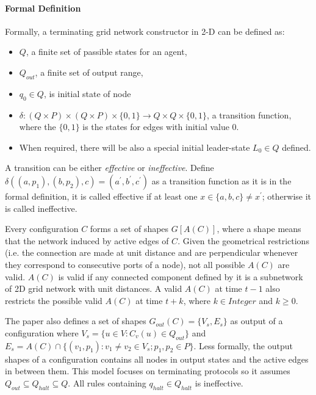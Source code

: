 \par\noindent
\paragraph{Formal Definition}
Formally, a terminating grid network constructor in 2-D can be defined as:
\begin{itemize}
  \item $Q$, a finite set of passible states for an agent,
  \item $Q_{out}$, a finite set of output range,
  \item $q_{0} \in Q $, is initial state of node
  \item $\delta: (Q \times P ) \times (Q \times P) \times \{0,1\} \to Q \times Q \times \{0,1\}$, a transition function, where the $\{0,1\}$ is the states for edges with initial value 0.
  \item When required, there will be also a special initial leader-state $L_{0} \in Q $ defined.
\end{itemize}

\par\noindent
A transition can be either \textit{effective}
or \textit{ineffective}. Define $\delta((a, p_{1}), (b, p_{2}), c) = (a^{'}, b^{'},c^{'})$ as a transition function
as it is in the formal definition, it is called effective if at least one $x \in \{a,b,c\} \not= x^{'} $; otherwise it is called ineffective.


\par\noindent
Every configuration $C$ forms a set of shapes $G[A(C)]$, where a shape means that the network induced
by active edges of $C$. Given the geometrical restrictions (i.e. the connection are
made at unit distance and are perpendicular whenever they correspond to consecutive ports of a node),
not all possible $A(C)$ are valid. $A(C)$ is valid if any connected component defined by it is a
subnetwork of 2D grid network with unit distances. A valid $A(C)$ at time $t -1$ also restricts the
possible valid $A(C)$ at time $t + k$, where $k \in Integer$ and $k \geq 0 $.


\par\noindent
The paper \cite{Mi17} also defines a set of
shapes $G_{out}(C) = \{V_{s}, E_{s}\}$ as output of a configuration where $V_{s} = \{u \in V : C_{v}(u) \in Q_{out} \}$
and $E_{s} = A(C) \cap \{ (v_{1}, p_{1}) : v_{1} \not= v_{2} \in V_{s}; p_{1}, p_{2} \in P \}$.
Less formally, the output shapes of a configuration contains all nodes in output states and the active edges in between them.
This model focuses on terminating protocols so it assumes $Q_{out} \subseteq Q_{halt} \subseteq Q $.
All rules containing $q_{halt} \in Q_{halt} $ is ineffective.

